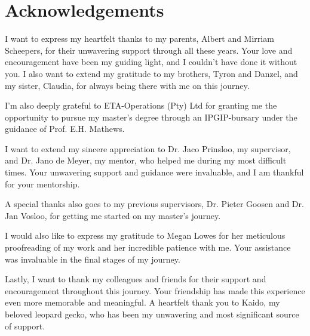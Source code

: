
\cleardoublepage
{}
\chapter*{Acknowledgements}

I want to express my heartfelt thanks to my parents, Albert and Mirriam Scheepers, for their unwavering support through all these years. Your love and encouragement have been my guiding light, and I couldn't have done it without you. I also want to extend my gratitude to my brothers, Tyron and Danzel, and my sister, Claudia, for always being there with me on this journey. \par I'm also deeply grateful to ETA-Operations (Pty) Ltd for granting me the opportunity to pursue my master's degree through an IPGIP-bursary under the guidance of Prof. E.H. Mathews.\par I want to extend my sincere appreciation to Dr. Jaco Prinsloo, my supervisor, and Dr. Jano de Meyer, my mentor, who helped me during my most difficult times. Your unwavering support and guidance were invaluable, and I am thankful for your mentorship. \par A special thanks also goes to my previous supervisors, Dr. Pieter Goosen and Dr. Jan Vosloo, for getting me started on my master's journey. \par I would also like to express my gratitude to Megan Lowes for her meticulous proofreading of my work and her incredible patience with me. Your assistance was invaluable in the final stages of my journey. \par Lastly, I want to thank my colleagues and friends for their support and encouragement throughout this journey. Your friendship has made this experience even more memorable and meaningful. A heartfelt thank you to Kaido, my beloved leopard gecko, who has been my unwavering and most significant source of support.